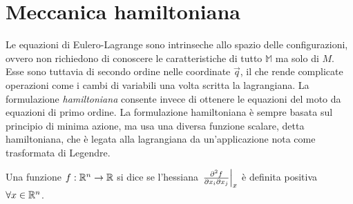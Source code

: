 \section{Meccanica hamiltoniana}
Le equazioni di Eulero-Lagrange sono intrinseche allo spazio delle configurazioni, ovvero non richiedono di conoscere le caratteristiche di tutto $\mathbb{M}$ ma solo di $M$. Esse sono tuttavia di secondo ordine nelle coordinate $\vec{q}$, il che rende complicate operazioni come i cambi di variabili una volta scritta la lagrangiana. La formulazione \emph{hamiltoniana} consente invece di ottenere le equazioni del moto da equazioni di primo ordine. La formulazione hamiltoniana è sempre basata sul principio di minima azione, ma usa una diversa funzione scalare, detta hamiltoniana, che è legata alla lagrangiana da un'applicazione nota come trasformata di Legendre.

\begin{definition}
  Una funzione $f:\mathbb{R}^n \to \mathbb{R}$ si dice  se l'hessiana $\eval{\pdv{f}{x_i}{x_j}}_x$ è definita positiva $\forall x \in \mathbb{R}^{n}$.
\end{definition}

